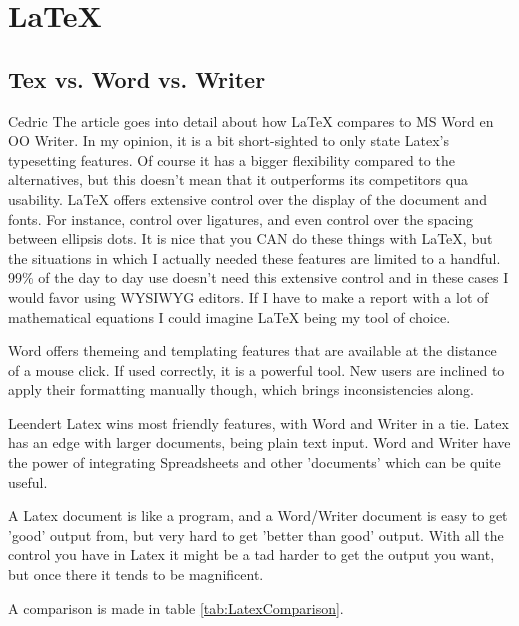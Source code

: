 \section{\LaTeX{}}
\label{sect:latex}

\subsection{Tex vs. Word vs. Writer}

\begin{cquote}{Cedric}
The article goes into detail about how LaTeX compares to MS Word en OO Writer. In my opinion, it is a bit short-sighted to only state Latex's typesetting features. Of course it has a bigger flexibility compared to the alternatives, but this doesn't mean that it outperforms its competitors qua usability. LaTeX offers extensive control over the display of the document and fonts. For instance, control over ligatures, and even control over the spacing between ellipsis dots. It is nice that you CAN do these things with LaTeX, but the situations in which I actually needed these features are limited to a handful. 99\% of the day to day use doesn't need this extensive control and in these cases I would favor using WYSIWYG editors. If I have to make a report with a lot of mathematical equations I could imagine LaTeX being my tool of choice.

\vspace{10pt}
Word offers themeing and templating features that are available at the distance of a mouse click. If used correctly, it is a powerful tool. New users are inclined to apply their formatting manually though, which brings inconsistencies along.
\end{cquote}


\begin{cquote}{Leendert}
Latex wins most friendly features, with Word and Writer in a tie. Latex has an edge with larger documents, being plain text input. Word and Writer have the power of integrating Spreadsheets and other 'documents' which can be quite useful.

\vspace{10pt}
A Latex document is like a program, and a Word/Writer document is easy to get 'good' output from, but very hard to get 'better than good' output. With all the control you have in Latex it might be a tad harder to get the output you want, but once there it tends to be magnificent.

A comparison is made in table \ref{tab:LatexComparison}.
\end{cquote}

